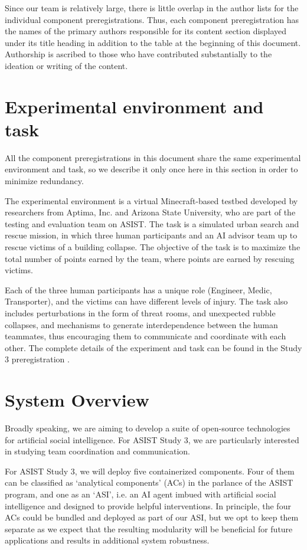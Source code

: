 Since our team is relatively large, there is little overlap in the author lists
for the individual component preregistrations. Thus, each component
preregistration has the names of the primary authors responsible for its
content section displayed under its title heading in addition to the table at
the beginning of this document. Authorship is ascribed to those who have
contributed substantially to the ideation or writing of the content.

\section{Experimental environment and task}

All the component preregistrations in this document share the same experimental
environment and task, so we describe it only once here in this section in order
to minimize redundancy.

The experimental environment is a virtual Minecraft-based testbed developed by
researchers from Aptima, Inc. and Arizona State University, who are part of the
testing and evaluation team on ASIST. 
The task is a simulated urban search and
rescue mission, in which three human participants and an AI advisor team up to
rescue victims of a building collapse. The objective of the task is to maximize
the total number of points earned by the team, where points are earned by
rescuing victims.

Each of the three human participants has a unique role
(Engineer, Medic, Transporter), and the victims can have different levels of
injury.
The task also includes perturbations in the form of threat rooms,
and unexpected rubble collapses, and mechanisms to generate interdependence
between the human teammates, thus encouraging them to communicate and
coordinate with each other.
The complete details of the experiment and task can be found in the Study 3
preregistration \cite{Huang.ea:2022}.

\section{System Overview}
\label{ch:system}

Broadly speaking, we are aiming to develop a suite of open-source technologies
for artificial social intelligence. For ASIST Study 3, we are particularly
interested in studying team coordination and communication.

For ASIST Study 3, we will deploy five containerized components. Four of them
can be classified as `analytical components' (ACs) in the parlance of the ASIST
program, and one as an `ASI', i.e. an AI agent imbued with artificial social
intelligence and designed to provide helpful interventions. In principle, the
four ACs could be bundled and deployed as part of our ASI, but we opt to keep
them separate as we expect that the resulting modularity will be beneficial for
future applications and results in additional system robustness.


